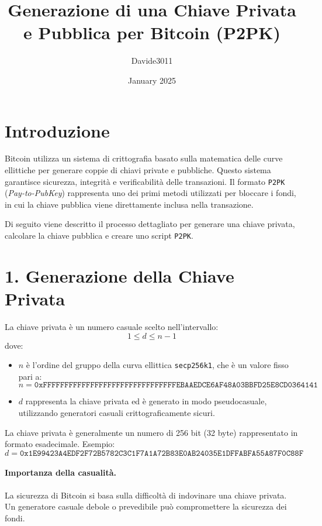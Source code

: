 \documentclass{article}
\title{Generazione di una Chiave Privata e Pubblica per Bitcoin (P2PK)}
\author{Davide3011}
\date{January 2025}
\begin{document}
\maketitle

\section*{Introduzione}
Bitcoin utilizza un sistema di crittografia basato sulla matematica delle curve ellittiche per generare coppie di chiavi private e pubbliche. Questo sistema garantisce sicurezza, integrità e verificabilità delle transazioni. Il formato \texttt{P2PK} (\textit{Pay-to-PubKey}) rappresenta uno dei primi metodi utilizzati per bloccare i fondi, in cui la chiave pubblica viene direttamente inclusa nella transazione.

Di seguito viene descritto il processo dettagliato per generare una chiave privata, calcolare la chiave pubblica e creare uno script \texttt{P2PK}.

\section*{1. Generazione della Chiave Privata}
La chiave privata è un numero casuale scelto nell'intervallo:
\[
1 \leq d \leq n - 1
\]
dove:
\begin{itemize}
    \item \( n \) è l'ordine del gruppo della curva ellittica \texttt{secp256k1}, che è un valore fisso pari a:
    \[
    n = \texttt{0xFFFFFFFFFFFFFFFFFFFFFFFFFFFFFFFEBAAEDCE6AF48A03BBFD25E8CD0364141}
    \]
    \item \( d \) rappresenta la chiave privata ed è generato in modo pseudocasuale, utilizzando generatori casuali crittograficamente sicuri.
\end{itemize}

La chiave privata è generalmente un numero di 256 bit (32 byte) rappresentato in formato esadecimale. Esempio:
\[
d = \texttt{0x1E99423A4EDF2F72B5782C3C1F7A1A72B83E0AB24035E1DFFABFA55A87F0C88F}
\]

\paragraph*{Importanza della casualità.} La sicurezza di Bitcoin si basa sulla difficoltà di indovinare una chiave privata. Un generatore casuale debole o prevedibile può compromettere la sicurezza dei fondi.
\end{document}
